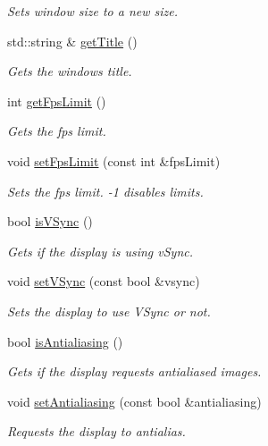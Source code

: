 \begin{DoxyCompactItemize}
\begin{DoxyCompactList}\small\item\em Sets window size to a new size. \end{DoxyCompactList}\item 
std\+::string \& \hyperlink{classflounder_1_1display_ad5fc46c79d236783ac883878ec065f36}{get\+Title} ()
\begin{DoxyCompactList}\small\item\em Gets the window\textquotesingle{}s title. \end{DoxyCompactList}\item 
int \hyperlink{classflounder_1_1display_aea9d5368ecd65c53e634d1cec52f9718}{get\+Fps\+Limit} ()
\begin{DoxyCompactList}\small\item\em Gets the fps limit. \end{DoxyCompactList}\item 
void \hyperlink{classflounder_1_1display_a7d24403c951e5a043675c3e7b02c3c34}{set\+Fps\+Limit} (const int \&fps\+Limit)
\begin{DoxyCompactList}\small\item\em Sets the fps limit. -\/1 disables limits. \end{DoxyCompactList}\item 
bool \hyperlink{classflounder_1_1display_a75f2ff773d4d26740df8531b20b0a091}{is\+V\+Sync} ()
\begin{DoxyCompactList}\small\item\em Gets if the display is using v\+Sync. \end{DoxyCompactList}\item 
void \hyperlink{classflounder_1_1display_a172501e1e99cde228d86fab59a3a636b}{set\+V\+Sync} (const bool \&vsync)
\begin{DoxyCompactList}\small\item\em Sets the display to use V\+Sync or not. \end{DoxyCompactList}\item 
bool \hyperlink{classflounder_1_1display_ab36d40e6a3be5272853e13e45da750b8}{is\+Antialiasing} ()
\begin{DoxyCompactList}\small\item\em Gets if the display requests antialiased images. \end{DoxyCompactList}\item 
void \hyperlink{classflounder_1_1display_ae9a340bfa09dfd6d08ebc0d21b4c77b0}{set\+Antialiasing} (const bool \&antialiasing)
\begin{DoxyCompactList}\small\item\em Requests the display to antialias. \end{DoxyCompactList}\item 

\end{DoxyCompactItemize}

